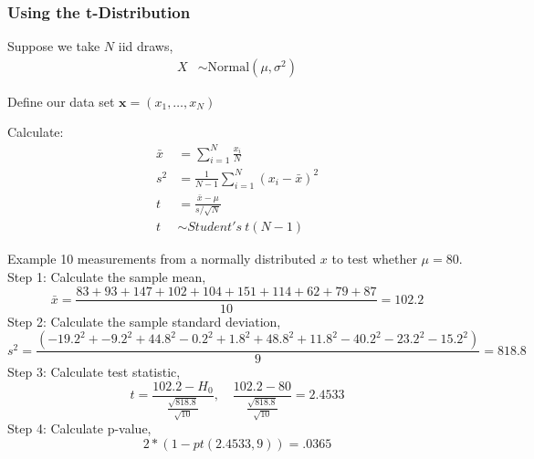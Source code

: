 \documentclass[aspectratio=169, handout]{beamer}
\numberwithin{equation}{section}
\begin{document}
%
%
%
%
%
%
%
%
%
%
%


\begin{frame}
\frametitle{Using the t-Distribution}
Suppose we take $N$ iid draws, 
\begin{align*}
X & \sim  \text{Normal}(\mu, \sigma^2) 
\end{align*}

Define our data set $\boldsymbol{x} = (x_{1}, \hdots, x_{N})$

Calculate:
\begin{align*}
 \bar{x} & =   \sum_{i=1}^{N} \frac{x_{i}}{N} \\
 s^2 & =  \frac{1}{N-1} \sum_{i=1}^{N} (x_{i} - \bar{x})^2\\
t & =  \frac{\bar{x} - \mu}{s/\sqrt{N}}  \\
t & \sim Student's\ t(N-1) 
\end{align*}
\end{frame}

\begin{frame}{Example}
10 measurements from a normally distributed $x$ to test whether $\mu=80$.\\
Step 1: Calculate the sample mean, 
$$\bar{x}=\frac{83 + 93 + 147+ 102+ 104+ 151+ 114+ 62+79+ 87}{10}=102.2$$
Step 2: Calculate the sample standard deviation, 
$$s^2=\frac{(-19.2^2+ -9.2^2+ 44.8^2 -0.2^2 +1.8^2+ 48.8^2+ 11.8^2-40.2^2  -23.2^2 -15.2^2)}{9}=818.8$$
Step 3: Calculate test statistic, 
$$t=\frac{102.2-H_0}{\frac{\sqrt{818.8}}{\sqrt{10}}},\quad \frac{102.2-80}{\frac{\sqrt{818.8}}{\sqrt{10}}}=2.4533$$
Step 4: Calculate p-value,
$$2*(1-pt(2.4533,9))=.0365$$
\end{frame}
\end{document}
